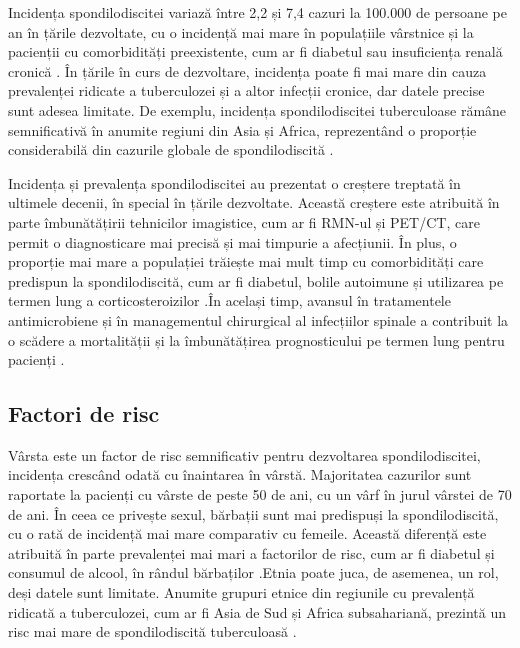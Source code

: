 \documentclass[romanian,12pt,a4paper]{article}
\begin{document}
Incidența spondilodiscitei variază între 2,2 și 7,4 cazuri la 100.000 de
persoane pe an în țările dezvoltate, cu o incidență mai mare în
populațiile vârstnice și la pacienții cu comorbidități preexistente, cum
ar fi diabetul sau insuficiența renală cronică
\cite{ImagingAssessmentSpine2024}. În țările în curs de dezvoltare,
incidența poate fi mai mare din cauza prevalenței ridicate a
tuberculozei și a altor infecții cronice, dar datele precise sunt adesea
limitate. De exemplu, incidența spondilodiscitei tuberculoase rămâne
semnificativă în anumite regiuni din Asia și Africa, reprezentând o
proporție considerabilă din cazurile globale de spondilodiscită
\cite{RadionuclideImagingMusculoskeletal2016}.

Incidența și prevalența spondilodiscitei au prezentat o creștere
treptată în ultimele decenii, în special în țările dezvoltate. Această
creștere este atribuită în parte îmbunătățirii tehnicilor imagistice,
cum ar fi RMN-ul și PET/CT, care permit o diagnosticare mai precisă și
mai timpurie a afecțiunii. În plus, o proporție mai mare a populației
trăiește mai mult timp cu comorbidități care predispun la
spondilodiscită, cum ar fi diabetul, bolile autoimune și utilizarea pe
termen lung a corticosteroizilor
\cite{RoleNuclearMedicine2012}\cite{ImagingAssessmentSpine2024}.În
același timp, avansul în tratamentele antimicrobiene și în managementul
chirurgical al infecțiilor spinale a contribuit la o scădere a
mortalității și la îmbunătățirea prognosticului pe termen lung pentru
pacienți \cite{RadionuclideImagingMusculoskeletal2016}.

\subsection{Factori de risc}

Vârsta este un factor de risc semnificativ pentru dezvoltarea
spondilodiscitei, incidența crescând odată cu înaintarea în vârstă.
Majoritatea cazurilor sunt raportate la pacienți cu vârste de peste 50
de ani, cu un vârf în jurul vârstei de 70 de ani. În ceea ce privește
sexul, bărbații sunt mai predispuși la spondilodiscită, cu o rată de
incidență mai mare comparativ cu femeile. Această diferență este
atribuită în parte prevalenței mai mari a factorilor de risc, cum ar fi
diabetul și consumul de alcool, în rândul bărbaților
\cite{RoleNuclearMedicine2012}.Etnia poate juca, de asemenea, un rol,
deși datele sunt limitate. Anumite grupuri etnice din regiunile cu
prevalență ridicată a tuberculozei, cum ar fi Asia de Sud și Africa
subsahariană, prezintă un risc mai mare de spondilodiscită tuberculoasă
\cite{ImagingAssessmentSpine2024}.
\end{document}
